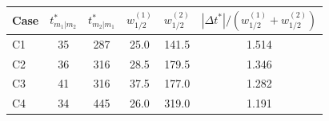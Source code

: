 \begin{tabular}{lccccc}
\toprule
Case & $t^*_{m_1|m_2}$ & $t^*_{m_2|m_1}$ & $w_{1/2}^{(1)}$ & $w_{1/2}^{(2)}$ & $|\Delta t^*|/(w_{1/2}^{(1)}+w_{1/2}^{(2)})$ \\
\midrule
C1 & 35 & 287 & 25.0 & 141.5 & 1.514 \\
C2 & 36 & 316 & 28.5 & 179.5 & 1.346 \\
C3 & 41 & 316 & 37.5 & 177.0 & 1.282 \\
C4 & 34 & 445 & 26.0 & 319.0 & 1.191 \\
\bottomrule
\end{tabular}